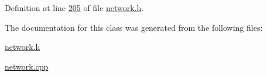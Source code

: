 Definition at line \hyperlink{network_8h_source_l00205}{205} of file \hyperlink{network_8h_source}{network.\+h}.



The documentation for this class was generated from the following files\+:\begin{DoxyCompactItemize}
\item 
\hyperlink{network_8h}{network.\+h}\item 
\hyperlink{network_8cpp}{network.\+cpp}\end{DoxyCompactItemize}
